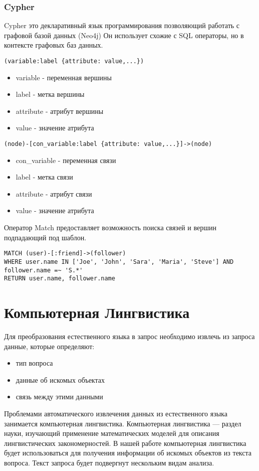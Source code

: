 \subsubsection{Cypher}
Cypher это декларативный язык программирования позволяющий работать с графовой базой данных (Neo4j)
Он использует схожие с SQL операторы, но в контексте графовых баз данных.
\begin{lstlisting}[caption={Пример вершины}]
(variable:label {attribute: value,...})
\end{lstlisting}
\begin{itemize}
\item variable - переменная вершины
\item label - метка вершины
\item attribute - атрибут вершины
\item value - значение атрибута
\end{itemize}
\begin{lstlisting}[caption={Пример связи}]
(node)-[con_variable:label {attribute: value,...}]->(node)
\end{lstlisting}
\begin{itemize}
\item con\_variable - переменная связи
\item label - метка связи
\item attribute - атрибут связи
\item value - значение атрибута
\end{itemize}
Оператор Match предоставляет возможность поиска связей и вершин подпадающий под шаблон.
\begin{lstlisting}[caption={Пример запроса}]
MATCH (user)-[:friend]->(follower)
WHERE user.name IN ['Joe', 'John', 'Sara', 'Maria', 'Steve'] AND follower.name =~ 'S.*'
RETURN user.name, follower.name
\end{lstlisting}

\section{Компьютерная Лингвистика}
Для преобразования естественного языка в запрос необходимо извлечь из запроса данные, которые определяют:
\begin{itemize}
\item тип вопроса
\item данные об искомых объектах
\item связь между этими данными
\end{itemize}
Проблемами автоматического извлечения данных из естественного языка занимается компьютерная лингвистика.
Компьютерная лингвистика — раздел науки, изучающий применение математических моделей для описания лингвистических закономерностей. В нашей работе компьютерная лингвистика будет использоваться для получения информации об искомых объектов из текста вопроса. Текст запроса будет подвергнут нескольким видам анализа.
